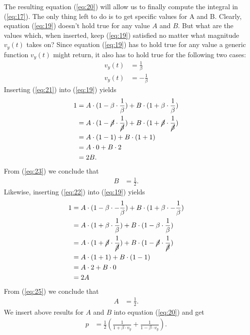 \documentclass[paper=a4, fontsize=11pt]{scrartcl} %
\numberwithin{equation}{section} %
\numberwithin{figure}{section} %
\numberwithin{table}{section} %
\begin{document}
The resulting equation (\ref{eq:20}) will allow us to finally compute the integral in (\ref{eq:17}). The only thing left to do is to get
specific values for A and B. Clearly, equation (\ref{eq:19}) doesn't hold true for any value $A$ and $B$. But what are the values which, when
inserted, keep (\ref{eq:19}) satisfied no matter what magnitude $v_y(t)$ takes on? Since equation (\ref{eq:19}) has to hold true
for any value a generic function $v_y(t)$ might return, it also has to hold true for the following two cases:
\begin{align}
v_y(t) &= \frac{1}{\beta}  \label{eq:21} \\
v_y(t) &= - \frac{1}{\beta} \label{eq:22}
\end{align}
Inserting (\ref{eq:21}) into (\ref{eq:19}) yields
\begin{align} 
1 &= A \cdot (1 - \beta \cdot \frac{1}{\beta}) + B \cdot (1 + \beta \cdot \frac{1}{\beta}) \\
  &= A \cdot (1 - \cancel{\beta} \cdot \frac{1}{\cancel{\beta}}) + B \cdot (1 + \cancel{\beta} \cdot \frac{1}{\cancel{\beta}}) \\
  &= A \cdot (1 - 1) + B \cdot (1 + 1) \\
  &= A \cdot 0 + B \cdot 2 \\
  &= 2B. \label{eq:23}
\end{align}
From (\ref{eq:23}) we conclude that
\begin{align}
B &= \frac{1}{2}.  \label{eq:24}
\end{align}
Likewise, inserting (\ref{eq:22}) into (\ref{eq:19}) yields
\begin{align} 
1 &= A \cdot (1 - \beta \cdot -\frac{1}{\beta}) + B \cdot (1 + \beta \cdot -\frac{1}{\beta}) \\
  &= A \cdot (1 + \beta \cdot \frac{1}{\beta}) + B \cdot (1 - \beta \cdot \frac{1}{\beta}) \\
  &= A \cdot (1 + \cancel{\beta} \cdot \frac{1}{\cancel{\beta}}) + B \cdot (1 - \cancel{\beta} \cdot \frac{1}{\cancel{\beta}}) \\
  &= A \cdot (1 + 1) + B \cdot (1 - 1) \\
  &= A \cdot 2 + B \cdot 0 \\
  &= 2A \label{eq:25}
\end{align}
From (\ref{eq:25}) we conclude that
\begin{align}
A &= \frac{1}{2}.  \label{eq:24}
\end{align}
We insert above results for $A$ and $B$ into equation (\ref{eq:20}) and get
\begin{align}
  p &= \frac{1}{2}\left(\frac{1}{1 + \beta \cdot v_y} + \frac{1}{1 - \beta \cdot v_y}\right). \label{eq:25}
\end{align}
\end{document}
